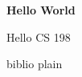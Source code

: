 \documentclass [a4paper, 11pt]
			{article}
\begin{document}
			{\bf Hello World}
\author	{Jon Kiefer S. Yap, Matthew Kendrick Co}

	{\par Hello CS 198 \cite{yeah} \cite{YapCo2013} \cite{YapCo2014}}
	
	 {biblio}
	 {plain}
\end{document}
